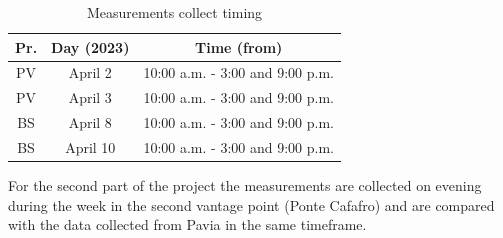 \documentclass[a4paper,10pt]{article}
\begin{document}
\begin{multicols}{2}
        \begin{table}[H]
                \centering
                \caption{\small Measurements collect timing}
                \vspace{0.3cm}
                \begin{tabular}{|c|c|c|}
                \hline
                \textbf{Pr.} & \textbf{Day (2023)} & \textbf{Time (from)} \\ \hline
                PV & April 2 & 10:00 a.m. - 3:00 and 9:00 p.m.\\ \hline
                PV & April 3 & 10:00 a.m. - 3:00 and 9:00 p.m.\\ \hline
                BS & April 8 & 10:00 a.m. - 3:00 and 9:00 p.m.\\ \hline
                BS & April 10 & 10:00 a.m. - 3:00 and 9:00 p.m.\\ \hline
                \end{tabular}
                \label{tab:Table1}
        \end{table}

\noindent
For the second part of the project the measurements are collected on evening during the week in the second vantage point (Ponte Cafafro) and are
compared with the data collected from Pavia in the same timeframe.

        



\end{multicols}
\end{document}
